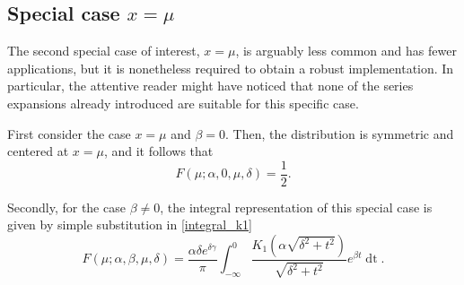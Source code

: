 \documentclass[10pt,a4paper,oneside]{article}
\numberwithin{equation}{section}
\begin{document}
\subsection{Special case $x = \mu$}
The second special case of interest, $x = \mu$, is arguably less common and has fewer applications, but it is nonetheless required to obtain a robust implementation. In particular, the attentive reader might have noticed that none of the series expansions already introduced are suitable for this specific case.

First consider the case $x = \mu$ and $\beta = 0$. Then, the distribution is symmetric and centered at $x = \mu$, and it follows that
\begin{equation}
F(\mu; \alpha, 0, \mu, \delta) = \frac{1}{2}.
\end{equation}

Secondly, for the case $\beta \neq 0$, the integral representation of this special case is given by simple substitution in \eqref{integral_k1}
\begin{equation}\label{integral_k1_x=mu}
F(\mu; \alpha, \beta, \mu, \delta) = \frac{\alpha \delta e^{\delta \gamma}}{\pi} \int_{-\infty}^{0} \frac{K_1\left(\alpha\sqrt{\delta^2 + t^2}\right)}{\sqrt{\delta^2 + t^2}} e^{\beta t} \mathop{dt}.
\end{equation}
\end{document}
